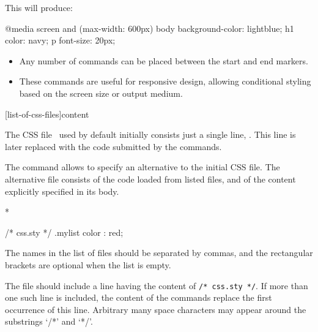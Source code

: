 This will produce:

\begin{csssource}
@media screen and (max-width: 600px) {
  body {background-color: lightblue;}
  h1 {color: navy;}
  p {font-size: 20px;}
}
\end{csssource}

\begin{itemize}
  \item Any number of  commands can be placed between the start and end markers.

  \item These commands are useful for responsive design, allowing conditional styling based on the screen size or output medium.

\end{itemize}


[list-of-css-files]content

The CSS file \texfourht\ used by default initially consists just
a single line,  . This line is later
replaced with the code submitted by the  commands.

The \texcommand{\CssFile} command allows to specify an alternative to the initial CSS file.
The alternative file consists of the code loaded from listed files, and of the
content explicitly specified in its body.

\begin{texsource}
{} {} {* }{} 
       
 
       
\CssFile 
/* css.sty */ 
.mylist { color : red; } 
\EndCssFile 
\end{texsource}

The names in the list of files should be separated by commas, and the rectangular brackets are optional when the list is empty.

The file should include a line having the content of \verb|/* css.sty */|. If
more than one such line is included, the content of the  commands
replace the first occurrence of this line. Arbitrary many space characters may
appear around the substrings ‘/*’ and ‘*/’. 
